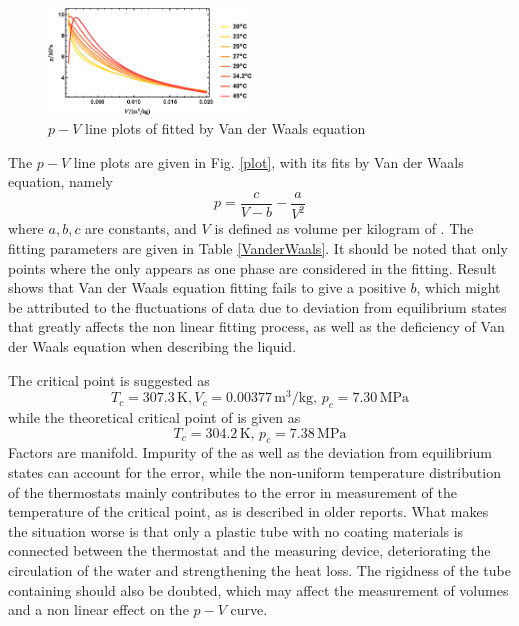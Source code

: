 \documentclass[%
 reprint,
 amsmath,amssymb,
 aps,
10.5pt,
]{revtex4-1}
\begin{document}
\begin{figure}
\centering
\includegraphics[width=0.48\textwidth]{figures/VanderWaalFit.eps}
\caption{$p-V$ line plots of  fitted by Van der Waals equation}
\end{figure}
The $p-V$ line plots are given in Fig. \ref{plot}, with its fits by Van der Waals equation, namely
\begin{equation}
	p = \frac{c}{V-b} - \frac{a}{V^2}
\end{equation}
where $a,b,c$ are constants, and $V$ is defined as volume per kilogram of . The fitting parameters are given in Table \ref{VanderWaals}. It should be noted that only points where the  only appears as one phase are considered in the fitting. Result shows that Van der Waals equation fitting fails to give a positive $b$, which might be attributed to the fluctuations of data due to deviation from equilibrium states that greatly affects the non linear fitting process, as well as the deficiency of Van der Waals equation when describing the  liquid. 

The critical point is suggested as
\begin{equation}
	T_c = 307.3\, \mathrm{K},V_c = 0.00377\, \mathrm{m^3/kg},\, p_c = 7.30 \, \mathrm{MPa}
\end{equation}
while the theoretical critical point of  is given as
\begin{equation}
	T_c = 304.2 \, \mathrm{K},\,  p_c = 7.38 \, \mathrm{MPa}
\end{equation}
Factors are manifold. Impurity of the  as well as the deviation from equilibrium states can account for the error, while the non-uniform temperature distribution of the thermostats mainly contributes to the error in measurement of the temperature of the critical point, as is described in older reports. What makes the situation worse is that only a plastic tube with no coating materials is connected between the thermostat and the measuring device, deteriorating the circulation of the water and strengthening the heat loss. The rigidness of the tube containing  should also be doubted, which may affect the measurement of volumes and a non linear effect on the $p-V$ curve.
\end{document}
